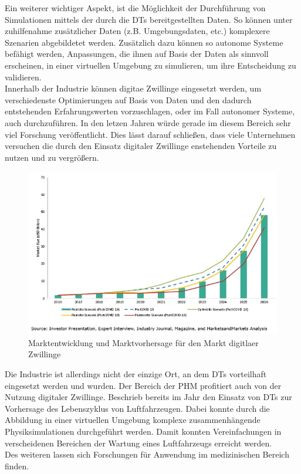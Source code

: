 Ein weiterer wichtiger Aspekt, ist die Möglichkeit der Durchführung von Simulationen mittels der durch die \ac{DT}s bereitgestellten Daten. So können unter zuhilfenahme zusätzlicher Daten (z.B. Umgebungsdaten, etc.) komplexere Szenarien abgebildetet werden. Zusätzlich dazu können so autonome Systeme befähigt werden, Anpassungen, die ihnen auf Basis der Daten als sinnvoll erscheinen, in einer virtuellen Umgebung zu simulieren, um ihre Entscheidung zu validieren. \autocite{rosen2015importance}\\
Innerhalb der Industrie können digitae Zwillinge eingesetzt werden, um verschiedenste Optimierungen auf Basis von Daten und den dadurch entstehenden Erfahrungswerten vorzuschlagen, oder im Fall autonomer Systeme, auch durchzuführen. In den letzen Jahren würde gerade im diesem Bereich sehr viel Forschung veröffentlicht. \autocite[S. 167657]{barricelli2019survey} Dies lässt darauf schließen, dass viele Unternehmen versuchen die durch den Einsatz digitaler Zwillinge enstehenden Vorteile zu nutzen und zu vergrößern. 

\begin{figure}[h]
    \centering
    \includegraphics[width=1.0\linewidth]{img/digital-twin-market12.jpg}
    \caption[Übersicht Marktgröße \ac{DT}]{Marktentwicklung und Marktvorhersage für den Markt digitlaer Zwillinge \autocite{markets2020}}
\end{figure}


Die Industrie ist allerdings nicht der einzige Ort, an dem \ac{DT}s vorteilhaft eingesetzt werden und wurden. Der Bereich der \ac{PHM} profitiert auch von der Nutzung digitaler Zwillinge. \citeauthor{tuegel2011reengineering} Beschrieb bereits im Jahr \citeyear{tuegel2011reengineering} den Einsatz von \ac{DT}s zur Vorhersage des Lebenszyklus von Luftfahrzeugen. Dabei konnte durch die Abbildung in einer virtuellen Umgebung komplexe zusammenhängende Physiksimulationen durchgeführt werden. Damit konnten Vereinfachungen in verscheidenen Bereichen der Wartung eines Luftfahrzeugs erreicht werden.\autocites{tao2018digital}{tuegel2011reengineering} \\
Des weiteren lassen sich Forschungen für Anwendung im medizinischen Bereich finden. \autocites{barricelli2019survey}{tao2018digital}

